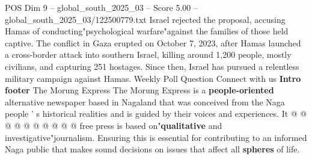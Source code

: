 \begin{textsample}{POS Dim 9 – global\_south\_2025\_03 – Score 5.00 – global\_south\_2025\_03/122500779.txt}
Israel rejected the proposal, accusing Hamas of conducting"psychological warfare"against the families of those held captive.
The conflict in Gaza erupted on October 7, 2023, after Hamas launched a cross-border attack into southern Israel, killing around 1,200 people, mostly civilians, and capturing 251 hostages.
Since then, Israel has pursued a relentless military campaign against Hamas.
Weekly Poll Question Connect with us \textbf{Intro} \textbf{footer} The Morung Express The Morung Express is a \textbf{people-oriented} alternative newspaper based in Nagaland that was conceived from the Naga people ' s historical realities and is guided by their voices and experiences.
It @ @ @ @ @ @ @ @ @ @ free press is based on"\textbf{qualitative} and investigative"journalism.
Ensuring this is essential for contributing to an informed Naga public that makes sound decisions on issues that affect all \textbf{spheres} of life.

\end{textsample}
